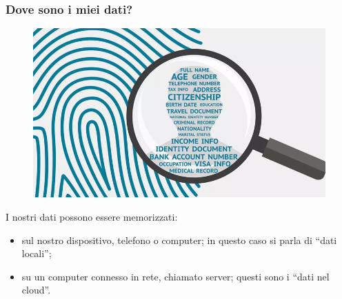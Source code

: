\documentclass[]{beamer}
\begin{document}
\begin{frame}
\frametitle{Dove sono i miei dati?}
\begin{figure}
  \includegraphics[width=.6\columnwidth]{img/datipers.png}
\end{figure}

I nostri dati possono essere memorizzati:

\begin{itemize}
  \item \alert{sul nostro dispositivo}, telefono o computer; in questo caso si parla di \alert{``dati locali''};\pause
  \item \alert{su un computer connesso in rete}, chiamato server; questi sono i \alert{``dati nel cloud''}.
\end{itemize}
\end{frame}
\end{document}
